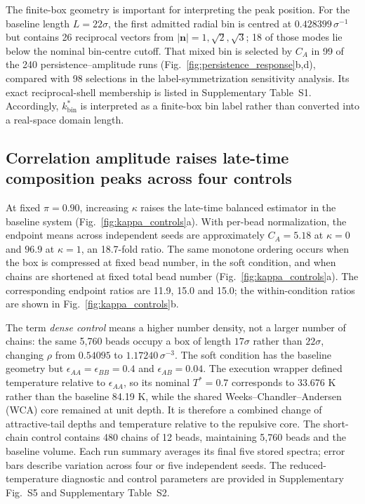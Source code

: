 \documentclass[pdflatex,sn-nature,onecolumn]{sn-jnl}
\begin{document}
The finite-box geometry is important for interpreting the peak position. For the baseline length $L=22\sigma$, the first admitted radial bin is centred at $0.428399\,\sigma^{-1}$ but contains 26 reciprocal vectors from $|\bm{n}|=1,\sqrt{2},\sqrt{3}$; 18 of those modes lie below the nominal bin-centre cutoff. That mixed bin is selected by $C_A$ in 99 of the 240 persistence--amplitude runs (Fig.~\ref{fig:persistence_response}b,d), compared with 98 selections in the label-symmetrization sensitivity analysis. Its exact reciprocal-shell membership is listed in Supplementary Table~S1. Accordingly, $k_{\mathrm{bin}}^*$ is interpreted as a finite-box bin label rather than converted into a real-space domain length.

\subsection{Correlation amplitude raises late-time composition peaks across four controls}

At fixed $\pi=0.90$, increasing $\kappa$ raises the late-time balanced estimator in the baseline system (Fig.~\ref{fig:kappa_controls}a). With per-bead normalization, the endpoint means across independent seeds are approximately $C_A=5.18$ at $\kappa=0$ and $96.9$ at $\kappa=1$, an 18.7-fold ratio. The same monotone ordering occurs when the box is compressed at fixed bead number, in the soft condition, and when chains are shortened at fixed total bead number (Fig.~\ref{fig:kappa_controls}a). The corresponding endpoint ratios are 11.9, 15.0 and 15.0; the within-condition ratios are shown in Fig.~\ref{fig:kappa_controls}b.

The term \emph{dense control} means a higher number density, not a larger number of chains: the same 5,760 beads occupy a box of length $17\sigma$ rather than $22\sigma$, changing $\rho$ from $0.54095$ to $1.17240\,\sigma^{-3}$. The soft condition has the baseline geometry but $\epsilon_{AA}=\epsilon_{BB}=0.4$ and $\epsilon_{AB}=0.04$. The execution wrapper defined temperature relative to $\epsilon_{AA}$, so its nominal $T^*=0.7$ corresponds to 33.676 K rather than the baseline 84.19 K, while the shared Weeks--Chandler--Andersen (WCA) core remained at unit depth. It is therefore a combined change of attractive-tail depths and temperature relative to the repulsive core. The short-chain control contains 480 chains of 12 beads, maintaining 5,760 beads and the baseline volume. Each run summary averages its final five stored spectra; error bars describe variation across four or five independent seeds. The reduced-temperature diagnostic and control parameters are provided in Supplementary Fig.~S5 and Supplementary Table~S2.
\end{document}
